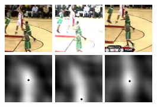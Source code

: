 \documentclass[10pt,twocolumn,letterpaper,french]{article}
\begin{document}
\begin{figure}[!h]
  \centering
  \includegraphics[width=60pt]{images/vids/basketflash/650/000649.png}
  \includegraphics[width=60pt]{images/vids/basketflash/650/000650.png}
  \includegraphics[width=60pt]{images/vids/basketflash/650/000651.png}\\
  \includegraphics[width=60pt]{images/vids/basketflash/650/corr/000649.png}
  \includegraphics[width=60pt]{images/vids/basketflash/650/corr/000650.png}
  \includegraphics[width=60pt]{images/vids/basketflash/650/corr/000651.png} 
 
 \hfill
 

\end{figure}
\end{document}
